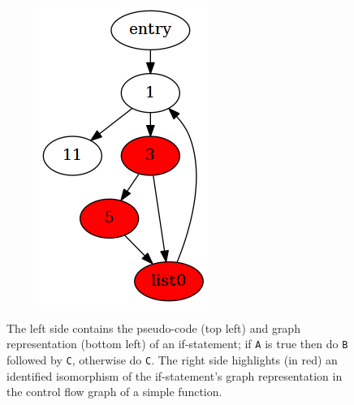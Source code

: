 \begin{figure}[htbp]
\begin{subfigure}[ht]{0.18\textwidth}
		\includegraphics[width=\textwidth]{poster/inc/foo.png}
	\end{subfigure}
	\caption{The left side contains the pseudo-code (top left) and graph representation (bottom left) of an if-statement; if \texttt{A} is true then do \texttt{B} followed by \texttt{C}, otherwise do \texttt{C}. The right side highlights (in red) an identified isomorphism of the if-statement's graph representation in the control flow graph of a simple function.\label{fig:representation_and_identification_of_primitive}} %
\end{figure}

